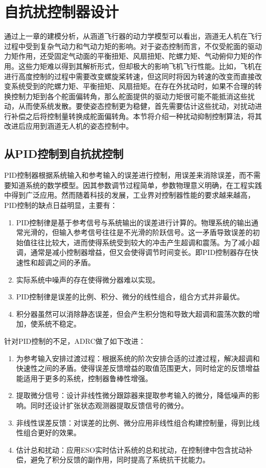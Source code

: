 \chapter{自抗扰控制器设计}
%
通过上一章的建模分析，从涵道飞行器的动力学模型可以看出，涵道无人机在飞行过程中受到复杂气动力和气动力矩的影响。对于姿态控制而言，不仅受舵面的驱动力矩作用，还受固定气动面的平衡扭矩、风扇扭矩、陀螺力矩、气动俯仰力矩的作用。这些力矩难以得到其解析形式，但却极大的影响飞机飞行性能。比如，飞机在进行高度控制的过程中需要改变螺旋桨转速，但这同时将因为转速的改变而直接改变系统受到的陀螺力矩、平衡扭矩、风扇扭矩。在存在外扰动时，如果不合理的转换控制力矩到各个舵面偏转角，那么舵面提供的驱动力矩很可能不能抵消这些扰动，从而使系统发散。要使姿态控制更为稳健，首先需要估计这些扰动，对扰动进行补偿之后将控制量转换成舵面偏转角。本节将介绍一种扰动抑制控制算法，将其改进后应用到涵道无人机的姿态控制中。
\section{从PID控制到自抗扰控制}
PID控制器根据系统输入和参考输入的误差进行控制，用误差来消除误差，而不需要知道系统的数学模型。因其参数调节过程简单，参数物理意义明确，在工程实践中得到广泛应用。然而随着科技的发展，工业界对控制器性能的要求越来越高，PID控制的缺点日益明显，主要有：
\begin{enumerate}
	\item PID控制律是基于参考信号与系统输出的误差进行计算的。物理系统的输出通常光滑的，但输入参考信号往往是不光滑的阶跃信号。这一矛盾导致误差的初始值往往比较大，进而使得系统受到较大的冲击产生超调和震荡。为了减小超调，通常是减小控制器增益，但又会使得调节时间变长。即PID控制器存在快速性和超调之间的矛盾。
	\item 实际系统中噪声的存在使得微分器难以实现。
	\item PID控制律是误差的比例、积分、微分的线性组合，组合方式并非最优。
	\item 积分器虽然可以消除静态误差，但会产生积分饱和导致大超调和震荡次数的增加，使系统不稳定。 
\end{enumerate}

针对PID控制的不足，ADRC做了如下改进：
\begin{enumerate}
	\item 为参考输入安排过渡过程：根据系统的阶次安排合适的过渡过程，解决超调和快速性之间的矛盾。使得误差反馈增益的取值范围更大，同时给定的反馈增益能适用于更多的系统，控制器鲁棒性增强。
	\item 提取微分信号：设计非线性微分跟踪器来提取参考输入的微分，降低噪声的影响。同时还设计扩张状态观测器提取反馈信号的微分。
	\item 非线性误差反馈：对误差的比例、微分应用非线性组合构建控制量，得到比线性组合更好的效果。
	\item 估计总和扰动：应用ESO实时估计系统的总和扰动，在控制律中包含扰动补偿，避免了积分反馈的副作用，同时提高了系统抗干扰能力。
\end{enumerate}
